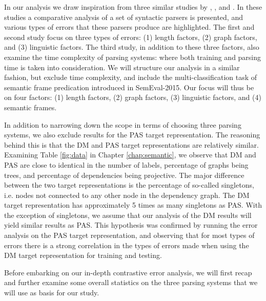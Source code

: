
In our analysis we draw inspiration from three similar studies by , , and . In these studies a comparative analysis of a set of syntactic parsers is presented, and various types of errors that these parsers produce are highlighted. The first and second study focus on three types of errors: (1) length factors, (2) graph factors, and (3) linguistic factors. The third study, in addition to these three factors, also examine the time complexity of parsing systems: where both training and parsing time is taken into consideration. We will structure our analysis in a similar fashion, but exclude time complexity, and include the multi-classification task of semantic frame predication introduced in SemEval-2015. Our focus will thus be on four factors: (1) length factors, (2) graph factors, (3) linguistic factors, and (4) semantic frames.

In addition to narrowing down the scope in terms of choosing three parsing systems, we also exclude results for the PAS target representation. The reasoning behind this is that the DM and PAS target representations are relatively similar. Examining Table \ref{fig:data} in Chapter \ref{chap:semantic}, we observe that DM and PAS are close to identical in the number of labels, percentage of graphs being trees, and percentage of dependencies being projective. The major difference between the two target representations is the percentage of so-called singletons, i.e. nodes not connected to any other node in the dependency graph. The DM target representation has approximately 5 times as many singletons as PAS. With the exception of singletons, we assume that our analysis of the DM results will yield similar results as PAS. This hypothesis was confirmed by running the error analysis on the PAS target representation, and observing that for most types of errors there is a strong correlation in the types of errors made when using the DM target representation for training and testing.

Before embarking on our in-depth contrastive error analysis, we will first recap and further examine some overall statistics on the three parsing systems that we will use as basis for our study.


